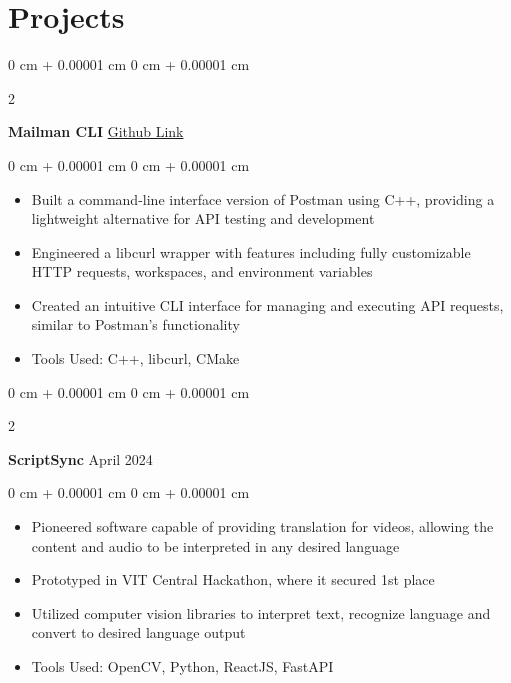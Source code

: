 \documentclass[10pt, letterpaper]{article}
\newenvironment{highlights}{
    \begin{itemize}[
        topsep=0.10 cm,
        parsep=0.10 cm,
        partopsep=0pt,
        itemsep=0pt,
        leftmargin=0 cm + 10pt
    ]
}{
    \end{itemize}
}
\newenvironment{onecolentry}{
    \begin{adjustwidth}{
        0 cm + 0.00001 cm
    }{
        0 cm + 0.00001 cm
    }
}{
    \end{adjustwidth}
}
\newenvironment{twocolentry}[2][]{
    \onecolentry
    \def\secondColumn{#2}
    \setcolumnwidth{\fill, 4.5 cm}
    \begin{paracol}{2}
}{
    \switchcolumn \raggedleft \secondColumn
    \end{paracol}
    \endonecolentry
}
\begin{document}
\section{Projects}
        
        \begin{twocolentry}{
            \href{https://github.com/anshmehta7x/mailman}{Github Link}
        }
            \textbf{Mailman CLI}\end{twocolentry}

        \vspace{0.10 cm}
        \begin{onecolentry}
            \begin{highlights}
                \item Built a command-line interface version of Postman using C++, providing a lightweight alternative for API testing and development
                \item Engineered a libcurl wrapper with features including fully customizable HTTP requests, workspaces, and environment variables
                \item Created an intuitive CLI interface for managing and executing API requests, similar to Postman's functionality
                \item Tools Used: C++, libcurl, CMake
            \end{highlights}
        \end{onecolentry}

        \vspace{0.2 cm}

        \begin{twocolentry}{
            April 2024
        }
            \textbf{ScriptSync}\end{twocolentry}

        \vspace{0.10 cm}
        \begin{onecolentry}
            \begin{highlights}
                \item Pioneered software capable of providing translation for videos, allowing the content and audio to be interpreted in any desired language 
                \item Prototyped in VIT Central Hackathon, where it secured 1st place 
                \item Utilized computer vision libraries to interpret text, recognize language and convert to desired language output 
                \item Tools Used: OpenCV, Python, ReactJS, FastAPI 
            \end{highlights}
        \end{onecolentry}
\end{document}
